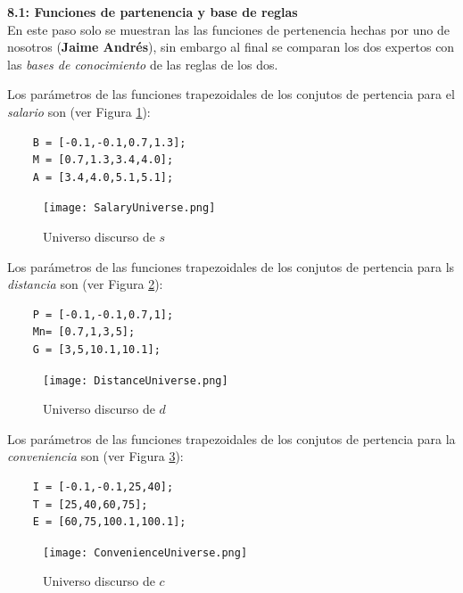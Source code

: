 \documentclass[10pt,onecolumn,twoside,letterpaper]{article}
\begin{document}
\par{\bf 8.1: Funciones de partenencia y base de reglas}\\
En este paso solo se muestran las las funciones de pertenencia hechas por uno de nosotros (\textbf{Jaime Andr\'es}), sin embargo al final se comparan los dos expertos con las \emph{bases de conocimiento} de las reglas de los dos.
\begin{multicols}{2}
  Los par\'ametros de las funciones trapezoidales de los conjutos de pertencia para el \emph{salario} son (ver Figura \ref{fig:UnivS}):
  \begin{lstlisting}
    B = [-0.1,-0.1,0.7,1.3];
    M = [0.7,1.3,3.4,4.0];
    A = [3.4,4.0,5.1,5.1];
  \end{lstlisting}
  \begin{figure}[H]
    \centering
    \hspace{-0.5cm}\texttt{[image: SalaryUniverse.png]}
    \caption{Universo discurso de $s$}
    \label{fig:UnivS}
  \end{figure}
\end{multicols}
\begin{multicols}{2}
  Los par\'ametros de las funciones trapezoidales de los conjutos de pertencia para ls \emph{distancia} son (ver Figura \ref{fig:UnivD}):
  \begin{lstlisting}
    P = [-0.1,-0.1,0.7,1];
    Mn= [0.7,1,3,5];
    G = [3,5,10.1,10.1];
  \end{lstlisting}
  \begin{figure}[H]
    \centering
    \hspace{-0.5cm}\texttt{[image: DistanceUniverse.png]}
    \caption{Universo discurso de $d$}
    \label{fig:UnivD}
  \end{figure}
\end{multicols}
\begin{multicols}{2}
  Los par\'ametros de las funciones trapezoidales de los conjutos de pertencia para la \emph{conveniencia} son (ver Figura \ref{fig:UnivC}):
  \begin{lstlisting}
    I = [-0.1,-0.1,25,40];
    T = [25,40,60,75];
    E = [60,75,100.1,100.1];
  \end{lstlisting}
  \begin{figure}[H]
    \centering
    \hspace{-0.5cm}\texttt{[image: ConvenienceUniverse.png]}
    \caption{Universo discurso de $c$}
    \label{fig:UnivC}
  \end{figure}
\end{multicols}
\end{document}

